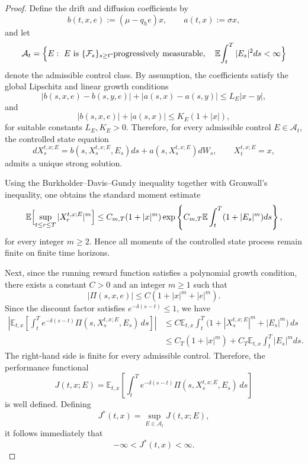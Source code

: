 \documentclass[11pt]{article}
\begin{document}
	\begin{proof}
		Define the drift and diffusion coefficients by
		\[
		b(t,x,e):=(\mu-q_he)x,
		\qquad
		a(t,x):=\sigma x,
		\]
		and let
		\[
		\mathcal{A}_{t}
		=
		\Bigl\{
		E:\ E \text{ is } \{\mathcal{F}_s\}_{s\ge t}\text{-progressively measurable},
		\quad
		\mathbb{E}\!\int_t^T |E_s|^2ds<\infty
		\Bigr\}
		\]
		denote the admissible control class. By assumption, the coefficients satisfy the global Lipschitz and linear growth conditions
		\[
		|b(s,x,e)-b(s,y,e)|+|a(s,x)-a(s,y)|
		\le L_E|x-y|,
		\]
		and
		\[
		|b(s,x,e)|+|a(s,x)|
		\le K_E(1+|x|),
		\]
		for suitable constants $L_E,K_E>0$. Therefore, for every admissible control $E\in\mathcal{A}_t$, the controlled state equation
		\[
		dX_s^{t,x;E}
		=
		b(s,X_s^{t,x;E},E_s)ds
		+
		a(s,X_s^{t,x;E})dW_s,
		\qquad
		X_t^{t,x;E}=x,
		\]
		admits a unique strong solution.
		
		Using the Burkholder--Davis--Gundy inequality together with Gronwall's inequality, one obtains the standard moment estimate
		\[
		\mathbb{E}
		\Bigl[
		\sup_{t\le r\le T}
		|X_r^{t,x;E}|^m
		\Bigr]
		\le
		C_{m,T}
		(1+|x|^m)
		\exp
		\left\{
		C_{m,T}
		\mathbb{E}
		\int_t^T
		(1+|E_s|^m)ds
		\right\},
		\]
		for every integer $m\ge 2$. Hence all moments of the controlled state process remain finite on finite time horizons.
		
		Next, since the running reward function satisfies a polynomial growth condition, there exists a constant $C>0$ and an integer $m\ge1$ such that
		\[
		|\Pi(s,x,e)|
		\le
		C(1+|x|^m+|e|^m).
		\]
		Since the discount factor satisfies $e^{-\delta(s-t)}\le1$, we have
		\[
		\begin{aligned}
			\left|
			\mathbb{E}_{t,x}
			\left[
			\int_t^T
			e^{-\delta(s-t)}
			\Pi(s,X_s^{t,x;E},E_s)\,ds
			\right]
			\right|
			&\le
			C
			\mathbb{E}_{t,x}
			\int_t^T
			\bigl(
			1+|X_s^{t,x;E}|^m+|E_s|^m
			\bigr)
			\,ds \\
			&\le
			C_T(1+|x|^m)
			+
			C_T
			\mathbb{E}_{t,x}
			\int_t^T
			|E_s|^m ds.
		\end{aligned}
		\]
		The right-hand side is finite for every admissible control. Therefore, the performance functional
		\[
		J(t,x;E)
		=
		\mathbb{E}_{t,x}
		\left[
		\int_t^T
		e^{-\delta(s-t)}
		\Pi(s,X_s^{t,x;E},E_s)\,ds
		\right]
		\]
		is well defined. Defining
		\[
		J^*(t,x)
		=
		\sup_{E\in\mathcal{A}_t}
		J(t,x;E),
		\]
		it follows immediately that
		\[
		-\infty
		<
		J^*(t,x)
		<
		\infty.
		\]
		

\end{proof}
\end{document}
